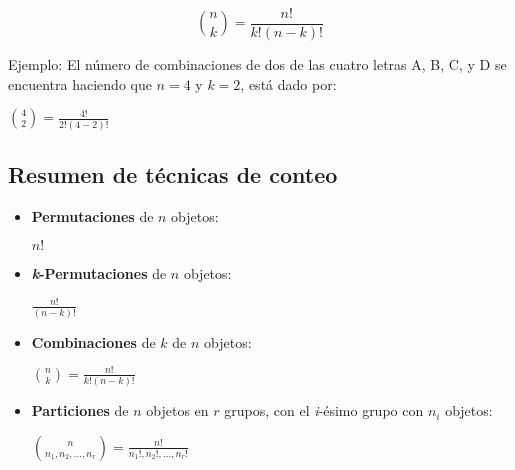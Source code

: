 \begin{equation}
	\binom{n}{k} = \frac{n!}{k!(n-k)!}
\end{equation}

Ejemplo: El n\'umero de combinaciones de dos de las cuatro letras A, B, C, y D
se encuentra haciendo que $n = 4$ y $ k = 2$, está dado por:

\begin{center}
	$\binom{4}{2} = \frac{4!}{2!(4-2)!}$
\end{center}






\subsection{Resumen de técnicas de conteo}

\begin{tcolorbox}[colback=gray!5!white,colframe=gray!60!black,title=Resumen: Técnicas de conteo]

	\begin{itemize}
		\item \textbf{Permutaciones} de $n$ objetos:
		\begin{center}
		$n!$
		\end{center}

		\item \textbf{\textit{k}-Permutaciones} de $n$ objetos:
		\begin{center}
		$\frac{n!}{(n-k)!}$
		\end{center}

		\item \textbf{Combinaciones} de $k$ de $n$ objetos:
		\begin{center}
		$\binom{n}{k} = \frac{n!}{k!(n-k)!}$
		\end{center}

		\item \textbf{Particiones} de $n$ objetos en $r$ grupos, con el \textit{i}-ésimo
		grupo con $n_i$ objetos:
		\begin{center}
			$\binom{n}{n_1,n_2,...,n_r} = \frac{n!}{n_1!,n_2!,...,n_r!}$
		\end{center}

	\end{itemize}
	
\end{tcolorbox}
